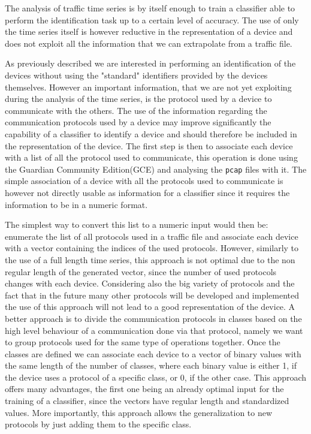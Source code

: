 The analysis of traffic time series is by itself enough to train a classifier able to perform the identification task up to a certain level of accuracy. The use of only the time series itself is however reductive in the representation of a device and does not exploit all the information that we can extrapolate from a traffic file.

As previously described we are interested in performing an identification of the devices without using the "standard" identifiers provided by the devices themselves. However an important information, that we are not yet exploiting during the analysis of the time series, is the protocol used by a device to communicate with the others.
The use of the information regarding the communication protocols used by a device may improve significantly the capability of a classifier to identify a device and should therefore be included in the representation of the device.
The first step is then to associate each device with a list of all the protocol used to communicate, this operation is done using the Guardian Community Edition(GCE) and analysing the \texttt{pcap} files with it. The simple association of a device with all the protocols used to communicate is however not directly usable as information for a classifier since it requires the information to be in a numeric format.

The simplest way to convert this list to a numeric input would then be: enumerate the list of all protocols used in a traffic file and associate each device with a vector containing the indices of the used protocols. However, similarly to the use of a full length time series, this approach is not optimal due to the non regular length of the generated vector, since the number of used protocols changes with each device. Considering also the big variety of protocols and the fact that in the future many other protocols will be developed and implemented the use of this approach will not lead to a good representation of the device.
A better approach is to divide the communication protocols in classes based on the high level behaviour of a communication done via that protocol, namely we want to group protocols used for the same type of operations together. Once the classes are defined we can associate each device to a vector of binary values with the same length of the number of classes, where each binary value is either 1, if the device uses a protocol of a specific class, or 0, if the other case. This approach offers many advantages, the first one being an already optimal input for the training of a classifier, since the vectors have regular length and standardized values. More importantly, this approach allows the generalization to new protocols by just adding them to the specific class.

